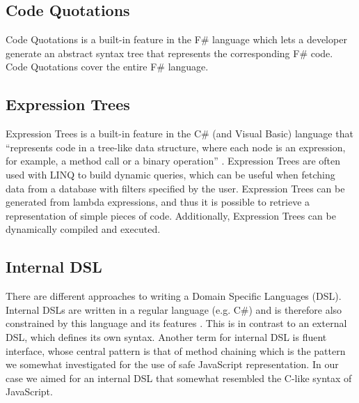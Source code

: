

	\subsection{Code Quotations} %
	\label{ssub:code_quotations}
		Code Quotations is a built-in feature in the F\# language which lets a developer generate an abstract syntax tree that represents the corresponding F\# code. Code Quotations cover the entire F\# language.


	\subsection{Expression Trees} %
	\label{ssub:expression_trees}
			Expression Trees is a built-in feature in the C\# (and Visual Basic) language that ``represents code in a tree-like data structure, where each node is an expression, for example, a method call or a binary operation'' \cite{expression_trees}. Expression Trees are often used with LINQ to build dynamic queries, which can be useful when fetching data from a database with filters specified by the user. Expression Trees can be generated from lambda expressions, and thus it is possible to retrieve a representation of simple pieces of code. Additionally, Expression Trees can be dynamically compiled and executed.

	\subsection{Internal DSL} %
	\label{ssub:internal_dsl}
		There are different approaches to writing a Domain Specific Languages (DSL). Internal DSLs are written in a regular language (e.g. C\#) and is therefore also constrained by this language and its features \cite{domain_specific_languages}. This is in contrast to an external DSL, which defines its own syntax. Another term for internal DSL is fluent interface, whose central pattern is that of method chaining which is the pattern we somewhat investigated for the use of safe JavaScript representation. In our case we aimed for an internal DSL that somewhat resembled the C-like syntax of JavaScript.

